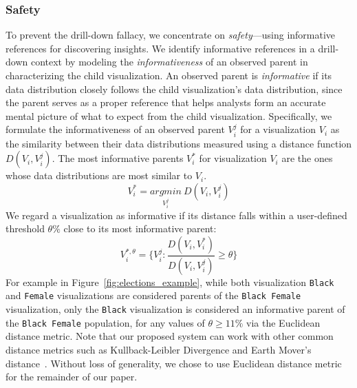 \subsubsection{Safety}
To prevent the drill-down fallacy, we concentrate on \emph{safety}---using informative references for discovering insights. We identify informative references in a drill-down context by modeling the \emph{informativeness} of an observed parent in characterizing the child visualization. An observed parent is \emph{informative} if its data distribution closely follows the child visualization's data distribution, since the parent serves as a proper reference that helps analysts form an accurate mental picture of what to expect from the child visualization. Specifically, we formulate the informativeness of an observed parent $V_i^j$ for a visualization $V_i$ as the similarity between their data distributions measured using a distance function $D(V_i, V_i^j)$. The most informative parents $V_i^*$ for visualization $V_i$ are the ones whose data distributions are most similar to $V_i$.
\begin{equation}
    V_i^*=\underset{V_i^j}{argmin}\ D(V_i, V_i^j)
\end{equation}
We regard a visualization as informative if its distance falls within a user-defined threshold $\theta\%$ close to its most informative parent:
\begin{equation}
    V_i^{*, \theta} = \{V_i^j : \frac{D(V_i, V_i^*)}{D(V_i, V_i^j)} \geq \theta\}
\end{equation}
For example in Figure~\ref{fig:elections_example}, while both visualization \texttt{Black} and \texttt{Female} visualizations are considered parents of the \texttt{Black Female} visualization, only the \texttt{Black} visualization is considered an informative parent of the \texttt{Black Female} population, for any values of $\theta \geq 11\%$ via the Euclidean distance metric. Note that our proposed system can work with other common distance metrics such as Kullback-Leibler Divergence and Earth Mover's distance~\cite{Vartak2015}. Without loss of generality, we chose to use Euclidean distance metric for the remainder of our paper.
